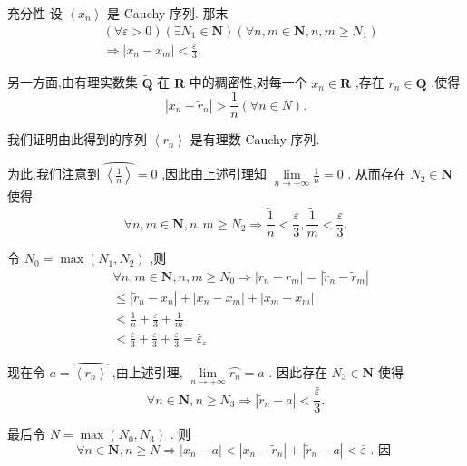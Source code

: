 充分性 设 $\left\langle  {x}_{n}\right\rangle$ 是 Cauchy 序列. 那末
\begin{align*}
	&\left( {\forall \varepsilon  > 0}\right) \left( {\exists {N}_{1} \in  \mathbf{N}}\right) \left( {\forall n,m \in  \mathbf{N},n,m \geq  {N}_{1}}\right)\\
	&\Rightarrow  \left| {{x}_{n} - {x}_{m}}\right|  < \frac{\varepsilon }{3}.
\end{align*}

另一方面,由有理实数集 $\widetilde{\mathbf{Q}}$ 在 $\mathbf{R}$ 中的稠密性,对每一个 ${x}_{n} \in  \mathbf{R}$ ,存在 ${r}_{n} \in  \mathbf{Q}$ ,使得
$$\left| {{x}_{n} - {\widetilde{r}}_{n}}\right|  > \frac{1}{n}\left( {\forall n \in  N}\right) .$$

我们证明由此得到的序列 $\left\langle  {r}_{n}\right\rangle$ 是有理数 Cauchy 序列.

为此,我们注意到 $\overset{⏜}{\left\langle  \frac{1}{n}\right\rangle  } = 0$ ,因此由上述引理知 $\mathop{\lim }\limits_{{n \rightarrow   + \infty }}\frac{1}{n} = 0$ . 从而存在 ${N}_{2} \in  \mathbf{N}$ 使得
$$\forall n,m \in  \mathbf{N},n,m \geq  {N}_{2} \Rightarrow  \frac{\widetilde{1}}{n} < \frac{\varepsilon }{3},\frac{\widetilde{1}}{m} < \frac{\varepsilon }{3}.$$

令 ${N}_{0} = \max \left( {{N}_{1},{N}_{2}}\right)$ ,则
\begin{align*}
	&\forall n,m \in  \mathbf{N},n,m \geq  {N}_{0} \Rightarrow  \left| {{r}_{n} - {r}_{m}}\right|  = \left| {{\widetilde{r}}_{n} - {\widetilde{r}}_{m}}\right|\\
	&\leq  \left| {{\widetilde{r}}_{n} - {x}_{n}}\right|  + \left| {{x}_{n} - {x}_{m}}\right|  + \left| {{x}_{m} - {x}_{m}}\right|\\
	&< \frac{1}{n} + \frac{\varepsilon }{3} + \frac{1}{m}\\
	&< \frac{\varepsilon }{3} + \frac{\varepsilon }{3} + \frac{\varepsilon }{3} = {\bar{\varepsilon }}_{ \circ  }
\end{align*}

现在令 $a = \overset{⏜}{\left\langle  {r}_{n}\right\rangle  }$ ,由上述引理, $\mathop{\lim }\limits_{{n \rightarrow   + \infty }}\overset{⏜}{{r}_{n}} = a$ . 因此存在 ${N}_{3} \in  \mathbf{N}$ 使得
$$\forall n \in  \mathbf{N},n \geq  {N}_{3} \Rightarrow  \left| {{\widetilde{r}}_{n} - a}\right|  < \frac{\bar{\varepsilon }}{3}.$$

最后令 $N = \max \left( {{N}_{0},{N}_{3}}\right)$ . 则
$$\forall n \in  \mathbf{N},n \geq  N \Rightarrow  \left| {{x}_{n} - a}\right|  < \left| {{x}_{n} - {\widetilde{r}}_{n}}\right|  + \left| {{\widetilde{r}}_{n} - a}\right|  < \bar{\varepsilon }\text{ . 因 }$$


